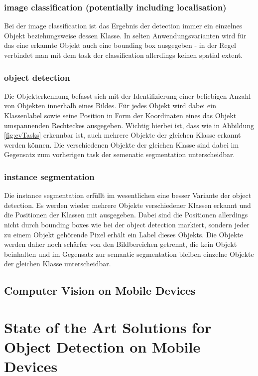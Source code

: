\documentclass[
			   fontsize=11pt,
               paper=a4,
               bibliography=totoc,
               idxtotoc,
               headsepline,
               footsepline,
               footinclude=false,
               BCOR=12mm,
               DIV=13,
               openany,   %
               ]
               {scrbook}
\begin{document}
\subsection{image classification (potentially including localisation)}
Bei der image classification ist das Ergebnis der detection immer ein einzelnes Objekt beziehungsweise dessen Klasse. In selten Anwendungsvarianten wird für das eine erkannte Objekt auch eine bounding box ausgegeben - in der Regel verbindet man mit dem task der classification allerdings keinen spatial extent.

\subsection{object detection}
Die Objekterkennung befasst sich mit der Identifizierung einer beliebigen Anzahl von Objekten innerhalb eines Bildes. Für jedes Objekt wird dabei ein Klassenlabel sowie seine Position in Form der Koordinaten eines das Objekt umspannenden Rechteckes ausgegeben. Wichtig hierbei ist, dass wie in Abbildung \ref{fig:cvTasks} erkennbar ist, auch mehrere Objekte der gleichen Klasse erkannt werden können. Die verschiedenen Objekte der gleichen Klasse sind dabei im Gegensatz zum vorherigen task der semenatic segmentation unterscheidbar.

\subsection{instance segmentation}
Die instance segmentation erfüllt im wesentlichen eine besser Variante der object detection. Es werden wieder mehrere Objekte verschiedener Klassen erkannt und die Positionen der Klassen mit ausgegeben. Dabei sind die Positionen allerdings nicht durch bounding boxes wie bei der object detection markiert, sondern jeder zu einem Objekt gehörende Pixel erhält ein Label dieses Objekts. Die Objekte werden daher noch schärfer von den Bildbereichen getrennt, die kein Objekt beinhalten und im Gegensatz zur semantic segmentation bleiben einzelne Objekte der gleichen Klasse unterscheidbar.


\section{Computer Vision on Mobile Devices}

\chapter{State of the Art Solutions for Object Detection on Mobile Devices}
\end{document}
